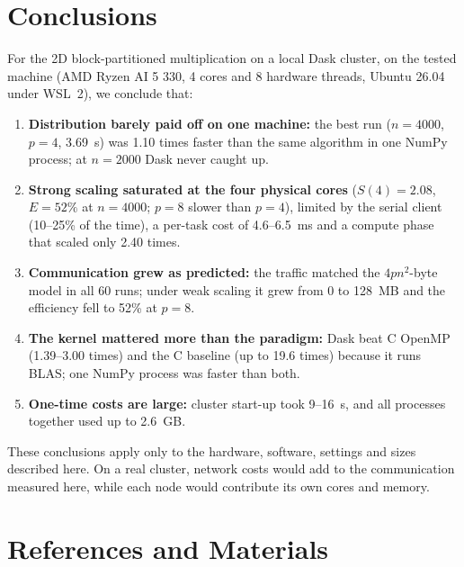 \documentclass[conference,a4paper]{IEEEtran}
\begin{document}
\section{Conclusions}
\label{sec:conclusions}
For the 2D block-partitioned multiplication on a local Dask cluster, on the
tested machine (AMD Ryzen AI 5 330, 4 cores and 8 hardware threads, Ubuntu
26.04 under WSL~2), we conclude that:
\begin{enumerate}[itemsep=1pt]
  \item \textbf{Distribution barely paid off on one machine:} the best run
        ($n = 4000$, $p = 4$, 3.69~s) was 1.10 times faster than the same
        algorithm in one NumPy process; at $n = 2000$ Dask never caught up.
  \item \textbf{Strong scaling saturated at the four physical cores}
        ($S(4) = 2.08$, $E = 52\%$ at $n = 4000$; $p = 8$ slower than $p = 4$),
        limited by the serial client (10--25\% of the time), a per-task cost of
        4.6--6.5~ms and a compute phase that scaled only 2.40 times.
  \item \textbf{Communication grew as predicted:} the traffic matched the
        $4pn^2$-byte model in all 60 runs; under weak scaling it grew from 0 to
        128~MB and the efficiency fell to 52\% at $p = 8$.
  \item \textbf{The kernel mattered more than the paradigm:} Dask beat C OpenMP
        (1.39--3.00 times) and the C baseline (up to 19.6 times) because it
        runs BLAS; one NumPy process was faster than both.
  \item \textbf{One-time costs are large:} cluster start-up took 9--16~s, and
        all processes together used up to 2.6~GB.
\end{enumerate}
These conclusions apply only to the hardware, software, settings and sizes
described here. On a real cluster, network costs would add to the communication
measured here, while each node would contribute its own cores and memory.

\section*{References and Materials}
\end{document}
